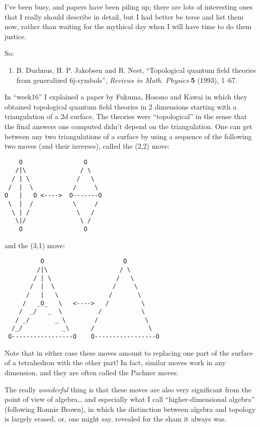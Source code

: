 \documentclass{article}
\def\tightlist{}
\begin{document}
I've been busy, and papers have been piling up; there are lots of
interesting ones that I really should describe in detail, but I had
better be terse and list them now, rather than waiting for the mythical
day when I will have time to do them justice.

So:

\begin{enumerate}
\def\labelenumi{\arabic{enumi})}
\tightlist
\item
  B. Durhuus, H. P. Jakobsen and R. Nest, ``Topological quantum field
  theories from generalized 6j-symbols'', \emph{Reviews in Math.
  Physics} \textbf{5} (1993), 1--67.
\end{enumerate}

In ``week16'' I explained a paper by Fukuma, Hosono and Kawai in which
they obtained topological quantum field theories in 2 dimensions
starting with a triangulation of a 2d surface. The theories were
``topological'' in the sense that the final answers one computed didn't
depend on the triangulation. One can get between any two triangulations
of a surface by using a sequence of the following two moves (and their
inverses), called the (2,2) move:

\begin{verbatim}
    O                 O
   /|\               / \
  / | \             /   \
 /  |  \           /     \
O   |   O <---->  O-------O
 \  |  /           \     /
  \ | /             \   /
   \|/               \ /
    O                 O
\end{verbatim}

and the (3,1) move:

\begin{verbatim}
          O                      O
         /|\                    / \
        / | \                  /   \
       /  |  \                /     \
      /   |   \              /       \
     /   _O_   \   <---->   /         \
    /  _/   _  \          /           \
   / _/       _ \        /             \
  /_/           _\      /               \
 O-----------------O    O-----------------O
\end{verbatim}

Note that in either case these moves amount to replacing one part of the
surface of a tetrahedron with the other part! In fact, similar moves
work in any dimension, and they are often called the Pachner moves.

The really \emph{wonderful} thing is that these moves are also very
significant from the point of view of algebra\ldots{} and especially
what I call ``higher-dimensional algebra'' (following Ronnie Brown), in
which the distinction between algebra and topology is largely erased,
or, one might say, revealed for the sham it always was.
\end{document}
